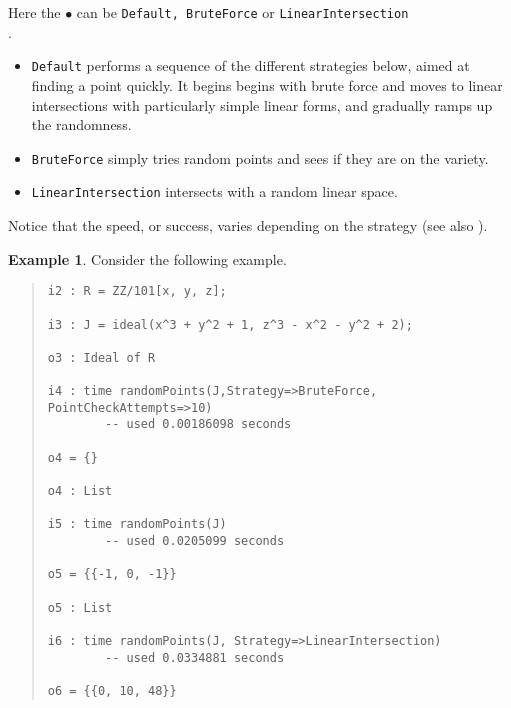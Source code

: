 \documentclass[11pt]{amsart}
\theoremstyle{definition}
\newtheorem{example}{Example}[section]
\begin{document}
    \begin{description}%
        \setlength{\itemsep}{5pt}
    \item[\tt Strategy => $\bullet$]   Here the $\bullet$ can be {\tt Default, BruteForce} or {\tt LinearIntersection} \\ .

    \begin{itemize}
    \item {\tt Default} performs a sequence of the different strategies below, aimed at finding a point quickly.  It begins begins with brute force and moves to linear intersections with particularly simple linear forms, and gradually ramps up the randomness.  
    \item {\tt BruteForce} simply tries random points and sees if they are on the variety.
           
    \item {\tt LinearIntersection} intersects with a random linear space.  
    \end{itemize}

    Notice that the speed, or success, varies depending on the strategy (see also ).

    \begin{example}\label{BruteForce}
        Consider the following example.
        ~~        
        {\small\color{blue}
    \begin{quote}
\begin{verbatim}
i2 : R = ZZ/101[x, y, z];

i3 : J = ideal(x^3 + y^2 + 1, z^3 - x^2 - y^2 + 2);

o3 : Ideal of R

i4 : time randomPoints(J,Strategy=>BruteForce, PointCheckAttempts=>10)
        -- used 0.00186098 seconds        

o4 = {}

o4 : List

i5 : time randomPoints(J)
        -- used 0.0205099 seconds

o5 = {{-1, 0, -1}}

o5 : List

i6 : time randomPoints(J, Strategy=>LinearIntersection)
        -- used 0.0334881 seconds                

o6 = {{0, 10, 48}}
\end{verbatim}
    \end{quote}
        }
    \end{example}%
    \vspace{-1em}



\end{description}
\end{document}
